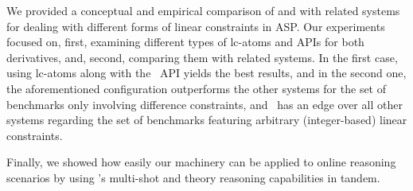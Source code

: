We provided a conceptual and empirical comparison of  and  with related systems 
for dealing with different forms of linear constraints in ASP.
%
Our experiments focused on,
first, examining different types of lc-atoms and APIs for both \clingo{} derivatives,
and, second, comparing them with related systems.
In the first case,  using  lc-atoms along with the \cpp\ API 
yields the best results,
and in the second one, 
the aforementioned  configuration outperforms the other systems for the set of benchmarks only involving difference constraints,
and \clingcon\ has an edge over all other systems regarding the set of benchmarks featuring arbitrary (integer-based) linear constraints.

Finally, %
we showed how easily our machinery can be applied to online reasoning scenarios
by using \clingo's multi-shot and theory reasoning capabilities in tandem.

